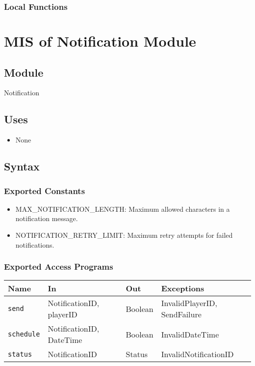 \documentclass[12pt, titlepage]{article}
\begin{document}
\subsubsection{Local Functions}

\section{MIS of Notification Module} \label{Module:Notification}

\subsection{Module}

Notification

\subsection{Uses}

\begin{itemize}
    \item None
\end{itemize}

\subsection{Syntax}

\subsubsection{Exported Constants}

\begin{itemize}
    \item MAX\_NOTIFICATION\_LENGTH: Maximum allowed characters in a notification message.
    \item NOTIFICATION\_RETRY\_LIMIT: Maximum retry attempts for failed notifications.
\end{itemize}

\subsubsection{Exported Access Programs}

\begin{center}
\begin{tabular}{p{2cm} p{4cm} p{4cm} p{2cm}}
\hline
\textbf{Name} & \textbf{In} & \textbf{Out} & \textbf{Exceptions} \\
\hline
\texttt{send} & NotificationID, playerID & Boolean & InvalidPlayerID, SendFailure \\
\hline
\texttt{schedule} & NotificationID, DateTime & Boolean & InvalidDateTime \\
\hline
\texttt{status} & NotificationID & Status & InvalidNotificationID \\
\hline
\end{tabular}
\end{center}
\end{document}
